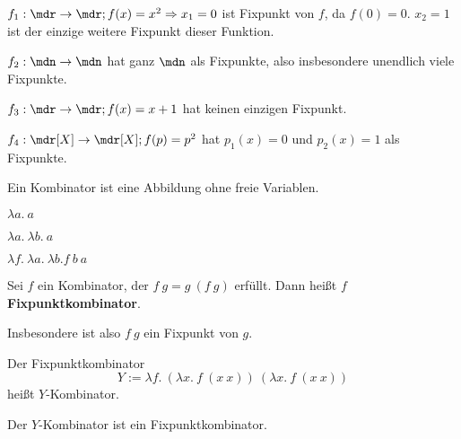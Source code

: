\begin{beispiel}[Fixpunkt]
    \begin{bspenum}
        \item $f_1: \mdr \rightarrow \mdr; f(x) = x^2 \Rightarrow x_1 = 0$ ist 
              Fixpunkt von $f$, da $f(0) = 0$. $x_2 = 1$ ist der einzige weitere
              Fixpunkt dieser Funktion.
        \item $f_2: \mdn \rightarrow \mdn$ hat ganz $\mdn$ als Fixpunkte, also
              insbesondere unendlich viele Fixpunkte.
        \item $f_3: \mdr \rightarrow \mdr; f(x) = x+1$ hat keinen einzigen Fixpunkt.
        \item $f_4: \mdr[X] \rightarrow \mdr[X]; f(p) = p^2$ hat $p_1(x) = 0$ und
              $p_2(x)=1$ als Fixpunkte.
    \end{bspenum}
\end{beispiel}

\begin{definition}[Kombinator]%
    Ein Kombinator ist eine Abbildung ohne freie Variablen.
\end{definition}

\begin{beispiel}%
    \begin{bspenum}
        \item $\lambda a.\ a$
        \item $\lambda a.\ \lambda b.\ a$
        \item $\lambda f.\ \lambda a.\ \lambda b. f\ b\ a$
    \end{bspenum}
\end{beispiel}

\begin{definition}%
    Sei $f$ ein Kombinator, der $f\ g = g\ (f\ g)$ erfüllt. Dann heißt $f$
    \textbf{Fixpunktkombinator}.
\end{definition}

Insbesondere ist also $f \ g$ ein Fixpunkt von $g$.

\begin{definition}[Y-Kombinator]%
    Der Fixpunktkombinator
    \[Y := \lambda f.\ (\lambda x.\ f\ (x\ x))\ (\lambda x.\ f\ (x\ x))\]
    heißt $Y$-Kombinator.
\end{definition}

\begin{behauptung}
    Der $Y$-Kombinator ist ein Fixpunktkombinator.
\end{behauptung}

